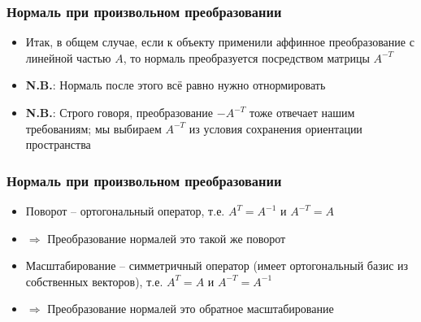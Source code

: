 \documentclass[10pt]{beamer}
\begin{document}
\begin{frame}[fragile]
\frametitle{Нормаль при произвольном преобразовании}
\begin{itemize}
\item Итак, в общем случае, если к объекту применили аффинное преобразование с линейной частью \begin{math}A\end{math}, то нормаль преобразуется посредством матрицы \begin{math}A^{-T}\end{math}
\pause
\item \alert{\textbf{N.B.}}: Нормаль после этого всё равно нужно отнормировать
\pause
\item \alert{\textbf{N.B.}}: Строго говоря, преобразование \begin{math}-A^{-T}\end{math} тоже отвечает нашим требованиям; мы выбираем \begin{math}A^{-T}\end{math} из условия сохранения ориентации пространства
\end{itemize}
\end{frame}

\begin{frame}[fragile]
\frametitle{Нормаль при произвольном преобразовании}
\begin{itemize}
\item Поворот -- ортогональный оператор, т.е. \begin{math}A^T = A^{-1}\end{math} и \begin{math}A^{-T}=A\end{math}
\pause
\item \begin{math}\Longrightarrow\end{math} Преобразование нормалей это такой же поворот
\pause
\begin{equation*}
\end{equation*}
\item Масштабирование -- симметричный оператор (имеет ортогональный базис из собственных векторов), т.е. \begin{math}A^T = A\end{math} и \begin{math}A^{-T}=A^{-1}\end{math}
\pause
\item \begin{math}\Longrightarrow\end{math} Преобразование нормалей это обратное масштабирование
\end{itemize}
\end{frame}
\end{document}
